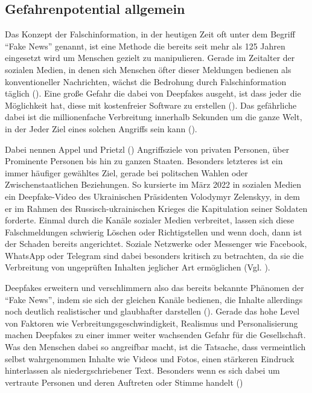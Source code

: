 \subsection{Gefahrenpotential allgemein}\label{Gefahrenpotential}
Das Konzept der Falschinformation, in der heutigen Zeit oft unter dem Begriff ``Fake News'' genannt, ist eine Methode die bereits seit mehr als 125 Jahren eingesetzt wird um Menschen gezielt zu manipulieren.
Gerade im Zeitalter der sozialen Medien, in denen sich Menschen öfter dieser Meldungen bedienen als konventioneller Nachrichten, wächst die Bedrohung durch Falschinformation täglich (\cite{Lee2019}).
Eine große Gefahr die dabei von Deepfakes ausgeht, ist dass jeder die Möglichkeit hat, diese mit kostenfreier Software zu erstellen (\cite{Appel2022}).
Das gefährliche dabei ist die millionenfache Verbreitung innerhalb Sekunden um die ganze Welt, in der Jeder Ziel eines solchen Angriffs sein kann (\cite{Shahzad2022}).
\par
Dabei nennen Appel und Prietzl (\cite{Appel2022}) Angriffsziele von privaten Personen, über Prominente Personen bis hin zu ganzen Staaten.
Besonders letzteres ist ein immer häufiger gewähltes Ziel, gerade bei politschen Wahlen oder Zwischenstaatlichen Beziehungen.
So kursierte im März 2022 in sozialen Medien ein Deepfake-Video des Ukrainischen Präsidenten Volodymyr Zelenskyy, in dem er im Rahmen des Russisch-ukrainischen Krieges die Kapitulation seiner Soldaten forderte.
Einmal durch die Kanäle sozialer Medien verbreitet, lassen sich diese Falschmeldungen schwierig Löschen oder Richtigstellen und wenn doch, dann ist der Schaden bereits angerichtet.
Soziale Netzwerke oder Messenger wie Facebook, WhatsApp oder Telegram sind dabei besonders kritisch zu betrachten, da sie die Verbreitung von ungeprüften Inhalten jeglicher Art ermöglichen (Vgl. \cite{Appel2022}).
\par
Deepfakes erweitern und verschlimmern also das bereits bekannte Phänomen der ``Fake News'', indem sie sich der gleichen Kanäle bedienen, die Inhalte allerdings noch deutlich realistischer und glaubhafter darstellen (\cite{Appel2022}).
Gerade das hohe Level von Faktoren wie Verbreitungsgeschwindigkeit, Realismus und Personalisierung machen Deepfakes zu einer immer weiter wachsenden Gefahr für die Gesellschaft.
Was den Menschen dabei so angreifbar macht, ist die Tatsache, dass vermeintlich selbst wahrgenommen Inhalte wie Videos und Fotos, einen stärkeren Eindruck hinterlassen als niedergschriebener Text.
Besonders wenn es sich dabei um vertraute Personen und deren Auftreten oder Stimme handelt (\cite{Kietzmann2020})
\newpage